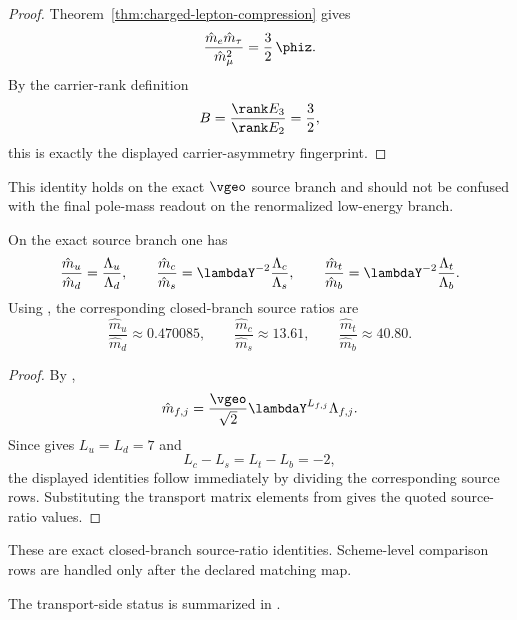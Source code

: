 \begin{proof}
Theorem~\ref{thm:charged-lepton-compression} gives
\[
\frac{\hat m_e \hat m_\tau}{\hat m_\mu^2}=\frac32\,\phiz.
\]
By the carrier-rank definition
\[
B=\frac{\rank E_3}{\rank E_2}=\frac32,
\]
this is exactly the displayed carrier-asymmetry fingerprint.
\end{proof}

\begin{remark}
This identity holds on the exact $\vgeo$ source branch and should not be confused with the final
pole-mass readout on the renormalized low-energy branch.
\end{remark}

\begin{corollary}
\label{cor:quark-source-ratios}
On the exact source branch one has
\[
\frac{\hat m_u}{\hat m_d}=\frac{\Lambda_u}{\Lambda_d},
\qquad
\frac{\hat m_c}{\hat m_s}=\lambdaY^{-2}\frac{\Lambda_c}{\Lambda_s},
\qquad
\frac{\hat m_t}{\hat m_b}=\lambdaY^{-2}\frac{\Lambda_t}{\Lambda_b}.
\]
Using , the corresponding closed-branch source ratios are
\[
\frac{\hat m_u}{\hat m_d}\approx\num{0.470085},
\qquad
\frac{\hat m_c}{\hat m_s}\approx\num{13.61},
\qquad
\frac{\hat m_t}{\hat m_b}\approx\num{40.80}.
\]
\end{corollary}

\begin{proof}
By ,
\[
\hat m_{f,j}=\frac{\vgeo}{\sqrt2}\lambdaY^{L_{f,j}}\Lambda_{f,j}.
\]
Since  gives $L_u=L_d=7$ and
\[
L_c-L_s=L_t-L_b=-2,
\]
the displayed identities follow immediately by dividing the corresponding source rows. Substituting
the transport matrix elements from  gives the quoted source-ratio
values.
\end{proof}

\begin{remark}
These are exact closed-branch source-ratio identities. Scheme-level comparison rows are handled
only after the declared matching map.
\end{remark}

The transport-side status is summarized in .


